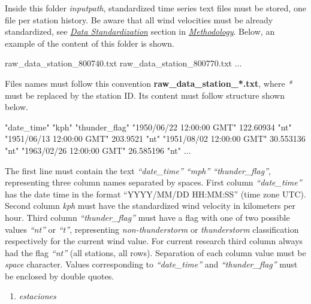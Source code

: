 \documentclass[12pt,twoside]{reedthesis}
\newenvironment{Shaded}{\begin{snugshade}}{\end{snugshade}}
\newcommand{\ExtensionTok}[1]{#1}
\newcommand{\StringTok}[1]{\textcolor[rgb]{0.31,0.60,0.02}{#1}}
\providecommand{\tightlist}{%
  \setlength{\itemsep}{0pt}\setlength{\parskip}{0pt}}
\begin{document}
Inside this folder \emph{inputpath}, standardized time series text files must be stored, one file per station history. Be aware that all wind velocities must be already standardized, see \emph{\protect\hyperlink{rmd-standardization}{Data Standardization}} section in \emph{\protect\hyperlink{rmd-method}{Methodology}}. Below, an example of the content of this folder is shown.

\scriptsize

\vspace{0.4cm}
\begin{Shaded}
\begin{Highlighting}[]
      \ExtensionTok{raw_data_station_800740.txt}
      \ExtensionTok{raw_data_station_800770.txt}
      \ExtensionTok{...}
\end{Highlighting}
\end{Shaded}
\normalsize

Files names must follow this convention \textbf{raw\_data\_station\_*.txt}, where \emph{*} must be replaced by the station ID. Its content must follow structure shown below.

\scriptsize

\vspace{0.4cm}
\begin{Shaded}
\begin{Highlighting}[]
      \StringTok{"date_time"} \StringTok{"kph"} \StringTok{"thunder_flag"}
      \StringTok{"1950/06/22 12:00:00 GMT"}  \ExtensionTok{122.60934} \StringTok{"nt"}
      \StringTok{"1951/06/13 12:00:00 GMT"}   \ExtensionTok{203.9521} \StringTok{"nt"}
      \StringTok{"1951/08/02 12:00:00 GMT"}  \ExtensionTok{30.553136} \StringTok{"nt"}
      \StringTok{"1963/02/26 12:00:00 GMT"}  \ExtensionTok{26.585196} \StringTok{"nt"}
      \ExtensionTok{...}
\end{Highlighting}
\end{Shaded}
\normalsize

The first line must contain the text \emph{``date\_time'' ``mph'' ``thunder\_flag''}, representing three column names separated by spaces. First column \emph{``date\_time''} has the date time in the format ``YYYY/MM/DD HH:MM:SS'' (time zone UTC). Second column \emph{kph} must have the standardized wind velocity in kilometers per hour. Third column \emph{``thunder\_flag''} must have a flag with one of two possible values \emph{``nt''} or \emph{``t''}, representing \emph{non-thunderstorm} or \emph{thunderstorm} classification respectively for the current wind value. For current research third column always had the flag \emph{``nt''} (all stations, all rows). Separation of each column value must be \emph{space} character. Values corresponding to \emph{``date\_time''} and \emph{``thunder\_flag''} must be enclosed by double quotes.
\begin{enumerate}
\def\labelenumi{\arabic{enumi}.}
\setcounter{enumi}{1}
\tightlist
\item
  \emph{estaciones}
\end{enumerate}
\scriptsize
\end{document}

